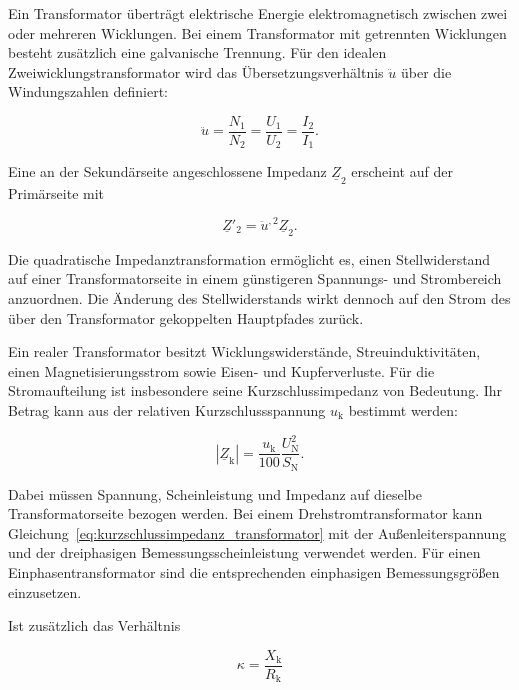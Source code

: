 Ein Transformator überträgt elektrische Energie elektromagnetisch zwischen
zwei oder mehreren Wicklungen. Bei einem Transformator mit getrennten
Wicklungen besteht zusätzlich eine galvanische Trennung. Für den idealen
Zweiwicklungstransformator wird das Übersetzungsverhältnis \(\ddot{u}\) über
die Windungszahlen definiert:

\begin{equation}
  \ddot{u}
  =
  \frac{N_1}{N_2}
  =
  \frac{U_1}{U_2}
  =
  \frac{I_2}{I_1}.
  \label{eq:transformator_uebersetzung}
\end{equation}

Eine an der Sekundärseite angeschlossene Impedanz
\(\underline{Z}_2\) erscheint auf der Primärseite mit

\begin{equation}
  \underline{Z}'_2
  =
  \ddot{u}^{,2}\underline{Z}_2.
  \label{eq:impedanztransformation}
\end{equation}

Die quadratische Impedanztransformation ermöglicht es, einen
Stellwiderstand auf einer Transformatorseite in einem günstigeren Spannungs-
und Strombereich anzuordnen. Die Änderung des Stellwiderstands wirkt dennoch
auf den Strom des über den Transformator gekoppelten Hauptpfades zurück.

Ein realer Transformator besitzt Wicklungswiderstände, Streuinduktivitäten,
einen Magnetisierungsstrom sowie Eisen- und Kupferverluste. Für die
Stromaufteilung ist insbesondere seine Kurzschlussimpedanz von Bedeutung. Ihr
Betrag kann aus der relativen Kurzschlussspannung \(u_{\mathrm{k}}\) bestimmt
werden:

\begin{equation}
  \left|\underline{Z}_{\mathrm{k}}\right|
  =
  \frac{u_{\mathrm{k}}}{100}
  \frac{U_{\mathrm{N}}^2}{S_{\mathrm{N}}}.
  \label{eq:kurzschlussimpedanz_transformator}
\end{equation}

Dabei müssen Spannung, Scheinleistung und Impedanz auf dieselbe
Transformatorseite bezogen werden. Bei einem Drehstromtransformator kann
Gleichung~\ref{eq:kurzschlussimpedanz_transformator} mit der
Außenleiterspannung und der dreiphasigen Bemessungsscheinleistung verwendet
werden. Für einen Einphasentransformator sind die entsprechenden einphasigen
Bemessungsgrößen einzusetzen.

Ist zusätzlich das Verhältnis

\begin{equation}
  \kappa
  =
  \frac{X_{\mathrm{k}}}{R_{\mathrm{k}}}
  \label{eq:x_r_verhaeltnis}
\end{equation}

